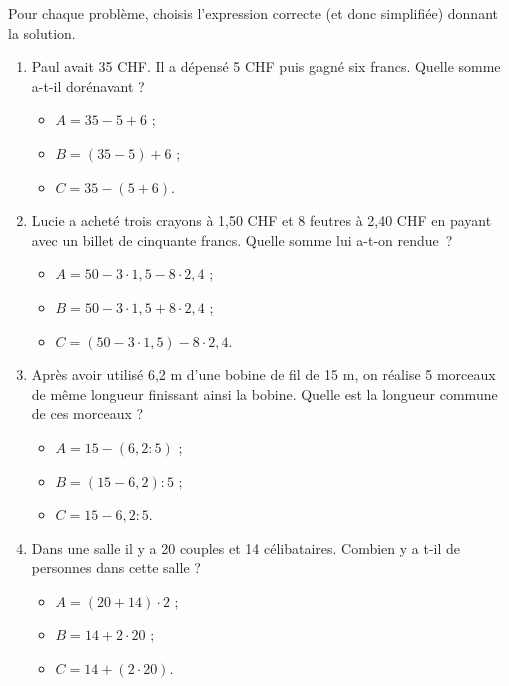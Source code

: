 \begin{exercice}
Pour chaque problème, choisis l'expression correcte (et donc simplifiée) donnant la solution.\\[-1em]
\begin{enumerate}
 \item Paul avait 35 CHF. Il a dépensé 5 CHF puis gagné six francs. Quelle somme a-t-il dorénavant ?
 \begin{itemize}
  \item $A = 35 - 5 + 6$ ;
  \item $B = (35 - 5) + 6$ ;
  \item $C = 35 - (5 + 6)$.
  \end{itemize}
 \item Lucie a acheté trois crayons à 1,50 CHF et 8 feutres à 2,40 CHF en payant avec un billet de cinquante francs. Quelle somme lui a-t-on rendue ?
  \begin{itemize}
  \item $A = 50 - 3 \cdot 1,5 - 8 \cdot 2,4$ ;
  \item $B = 50 - 3 \cdot 1,5 + 8 \cdot 2,4$ ;
  \item $C = (50 - 3 \cdot 1,5) - 8 \cdot 2,4$.
  \end{itemize}
 \item Après avoir utilisé 6,2 m d'une bobine de fil de 15 m, on réalise 5 morceaux de même longueur finissant ainsi la bobine. Quelle est la longueur commune de ces morceaux ?
  \begin{itemize}
   \item $A = 15 - (6,2 : 5)$ ;
   \item $B = (15 - 6,2) : 5$ ;
   \item $C = 15 - 6,2 : 5$.
   \end{itemize}
 \item Dans une salle il y a 20 couples et 14 célibataires. Combien y a t-il de personnes dans cette salle ?
  \begin{itemize}
   \item $A = (20 + 14) \cdot 2$ ;
   \item $B = 14 + 2 \cdot 20$ ;
   \item $C = 14 + (2 \cdot 20)$.
   \end{itemize}
 \end{enumerate}

\end{exercice}


